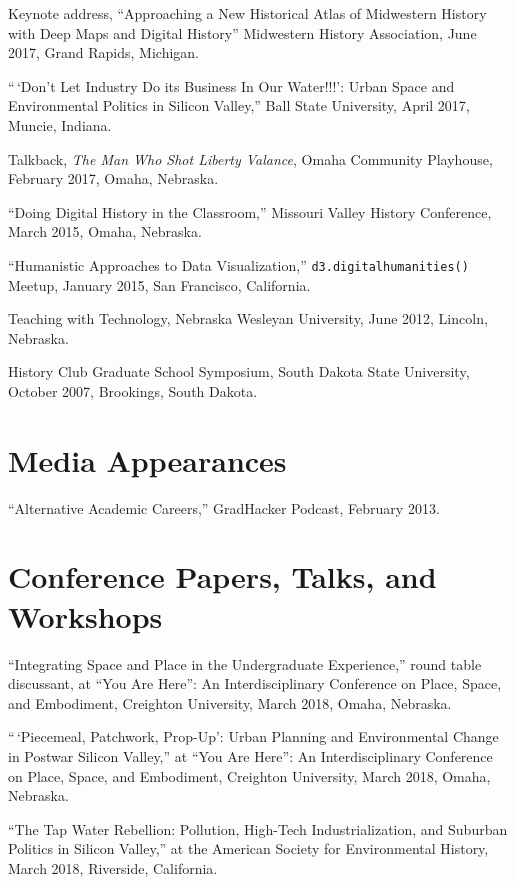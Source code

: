 Keynote address, ``Approaching a New Historical Atlas of Midwestern
History with Deep Maps and Digital History'' Midwestern History
Association, June 2017, Grand Rapids, Michigan.

``\,`Don't Let Industry Do its Business In Our Water!!!': Urban Space
and Environmental Politics in Silicon Valley,'' Ball State University,
April 2017, Muncie, Indiana.

Talkback, \emph{The Man Who Shot Liberty Valance}, Omaha Community
Playhouse, February 2017, Omaha, Nebraska.

``Doing Digital History in the Classroom,'' Missouri Valley History
Conference, March 2015, Omaha, Nebraska.

``Humanistic Approaches to Data Visualization,''
\texttt{d3.digitalhumanities()} Meetup, January 2015, San Francisco,
California.

Teaching with Technology, Nebraska Wesleyan University, June 2012,
Lincoln, Nebraska.

History Club Graduate School Symposium, South Dakota State University,
October 2007, Brookings, South Dakota.

\section{Media Appearances}\label{media-appearances}

``Alternative Academic Careers,'' GradHacker Podcast, February 2013.

\section{Conference Papers, Talks, and
Workshops}\label{conference-papers-talks-and-workshops}

``Integrating Space and Place in the Undergraduate Experience,'' round
table discussant, at ``You Are Here'': An Interdisciplinary Conference
on Place, Space, and Embodiment, Creighton University, March 2018,
Omaha, Nebraska.

``\,`Piecemeal, Patchwork, Prop-Up': Urban Planning and Environmental
Change in Postwar Silicon Valley,'' at ``You Are Here'': An
Interdisciplinary Conference on Place, Space, and Embodiment, Creighton
University, March 2018, Omaha, Nebraska.

``The Tap Water Rebellion: Pollution, High-Tech Industrialization, and
Suburban Politics in Silicon Valley,'' at the American Society for
Environmental History, March 2018, Riverside, California.

